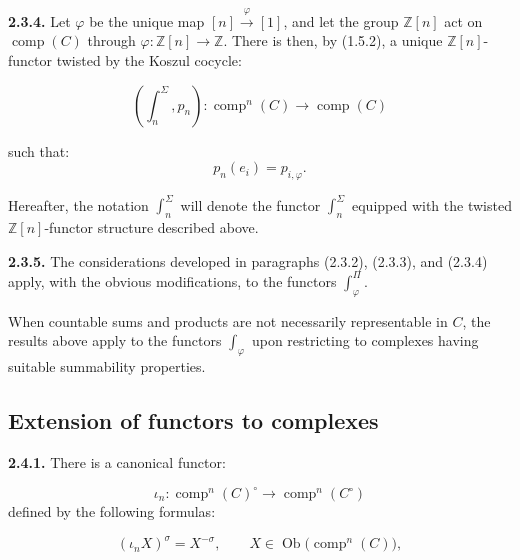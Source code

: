 %
\noindent\textbf{2.3.4.}\quad
Let $\varphi$ be the unique map $[n]\xrightarrow{\varphi}[1]$, and let
the group $\mathbb Z[n]$ act on $\operatorname{comp}(C)$ through
$\varphi\colon\mathbb Z[n]\longrightarrow\mathbb Z$. There is then, by
(1.5.2), a unique $\mathbb Z[n]$-functor twisted by the Koszul cocycle:

\begin{equation}
  \left(\int_n^\Sigma,p_n\right)\colon
  \operatorname{comp}^{n}(C)\longrightarrow\operatorname{comp}(C)
  \tag{2.3.4.1}
\end{equation}

such that:
\begin{equation*}
  p_n(e_i)=p_{i,\varphi}.
\end{equation*}

Hereafter, the notation $\int_n^\Sigma$ will denote the functor
$\int_n^\Sigma$ equipped with the twisted $\mathbb Z[n]$-functor structure
described above.

\noindent\textbf{2.3.5.}\quad
The considerations developed in paragraphs (2.3.2), (2.3.3), and (2.3.4)
apply, with the obvious modifications, to the functors $\int_\varphi^\Pi$.

When countable sums and products are not necessarily representable in $C$,
the results above apply to the functors $\int_\varphi$ upon restricting to
complexes having suitable summability properties.

\subsection{Extension of functors to complexes}

\noindent\textbf{2.4.1.}\quad
There is a canonical functor:

\begin{equation}
  \iota_n\colon
  \operatorname{comp}^{n}(C)^\circ
  \longrightarrow
  \operatorname{comp}^{n}(C^\circ)
  \tag{2.4.1.1}
\end{equation}
defined by the following formulas:

\begin{equation*}
  (\iota_nX)^\sigma=X^{-\sigma},
  \qquad X\in\operatorname{Ob}\bigl(\operatorname{comp}^{n}(C)\bigr),
\end{equation*}

